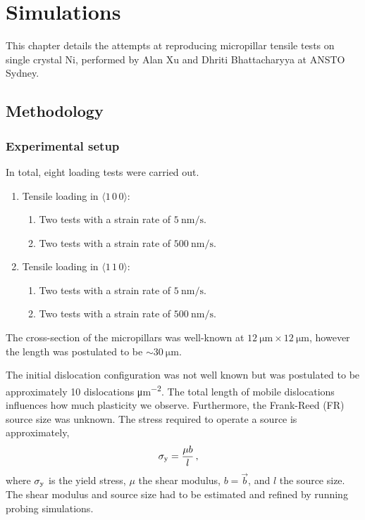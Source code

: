\chapter{Simulations}\label{c:simulations}

This chapter details the attempts at reproducing micropillar tensile tests on single crystal Ni, performed by Alan Xu and Dhriti Bhattacharyya at ANSTO Sydney.

\section{Methodology}

\subsection{Experimental setup}
\label{ss:experimentalSetup}

In total, eight loading tests were carried out.
\begin{enumerate}
    \item Tensile loading in $\langle 1\, 0\, 0 \rangle$:
          \begin{enumerate}
              \item Two tests with a strain rate of $\SI{5}{\nano\metre\per\second}$.
              \item Two tests with a strain rate of $\SI{500}{\nano\metre\per\second}$.
          \end{enumerate}
    \item Tensile loading in $\langle 1\, 1\, 0 \rangle$:
          \begin{enumerate}
              \item Two tests with a strain rate of $\SI{5}{\nano\metre\per\second}$.
              \item Two tests with a strain rate of $\SI{500}{\nano\metre\per\second}$.
          \end{enumerate}
\end{enumerate}

The cross-section of the micropillars was well-known at $\SI{12}{\micro\metre} \times \SI{12}{\micro\metre}$, however the length was postulated to be $\sim \SI{30}{\micro\metre}$.

The initial dislocation configuration was not well known but was postulated to be approximately 10 dislocations \si{\micro\metre^{-2}}. The total length of mobile dislocations influences how much plasticity we observe. Furthermore, the Frank-Reed (FR) source size was unknown. The stress required to operate a source is approximately,
\begin{align}\label{eq:yieldStress}
    \sigma_{\textrm{y}} & = \dfrac{\mu b}{l}\,,
\end{align}
where $\sigma_{\textrm{y}}$ is the yield stress, $\mu$ the shear modulus, $b = \vec{b} $, and $l$ the source size. The shear modulus and source size had to be estimated and refined by running probing simulations.

